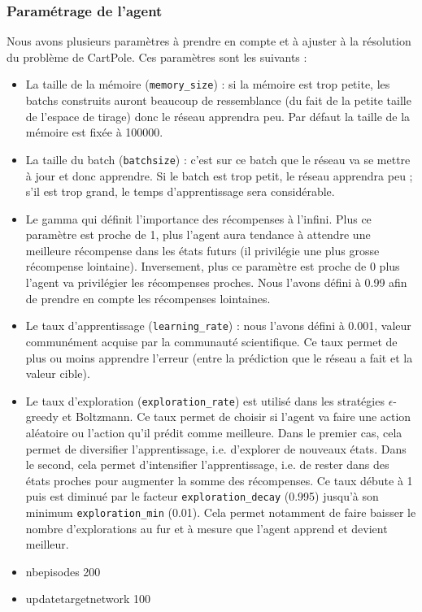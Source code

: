 \documentclass[10pt,a4paper]{article}
\begin{document}
\subsubsection{Paramétrage de l'agent} \label{paramDQN}
Nous avons plusieurs paramètres à prendre en compte et à ajuster à la résolution du problème de CartPole. Ces paramètres sont les suivants : 
\begin{itemize}
	\item La taille de la mémoire (\lstinline{memory_size}) : si la mémoire est trop petite, les batchs construits auront beaucoup de ressemblance (du fait de la petite taille de l'espace de tirage) donc le réseau apprendra peu. Par défaut la taille de la mémoire est fixée à 100000.
    \item La taille du batch (\lstinline{batchsize}) : c'est sur ce batch que le réseau va se mettre à jour et donc apprendre. Si le batch est trop petit, le réseau apprendra peu ; s'il est trop grand, le temps d'apprentissage sera considérable.
    \item Le gamma qui définit l'importance des récompenses à l'infini. Plus ce paramètre est proche de 1, plus l'agent aura tendance à attendre une meilleure récompense dans les états futurs (il privilégie une plus grosse récompense lointaine). Inversement, plus ce paramètre est proche de 0 plus l'agent va privilégier les récompenses proches. Nous l'avons défini à 0.99 afin de prendre en compte les récompenses lointaines.
    \item Le taux d'apprentissage (\lstinline{learning_rate}) : nous l'avons défini à 0.001, valeur communément acquise par la communauté scientifique. Ce taux permet de plus ou moins apprendre l'erreur (entre la prédiction que le réseau a fait et la valeur cible).
    \item Le taux d'exploration (\lstinline{exploration_rate}) est utilisé dans les stratégies $\epsilon$-greedy et Boltzmann. Ce taux permet de choisir si l'agent va faire une action aléatoire ou l'action qu'il prédit comme meilleure. Dans le premier cas, cela permet de diversifier l'apprentissage, i.e. d'explorer de nouveaux états. Dans le second, cela permet d'intensifier l'apprentissage, i.e. de rester dans des états proches pour augmenter la somme des récompenses. Ce taux débute à 1 puis est diminué par le facteur \lstinline{exploration_decay} (0.995) jusqu'à son minimum \lstinline{exploration_min} (0.01). Cela permet notamment de faire baisser le nombre d'explorations au fur et à mesure que l'agent apprend et devient meilleur.
    \item nbepisodes 200
    \item updatetargetnetwork 100 

\end{itemize}
\end{document}

